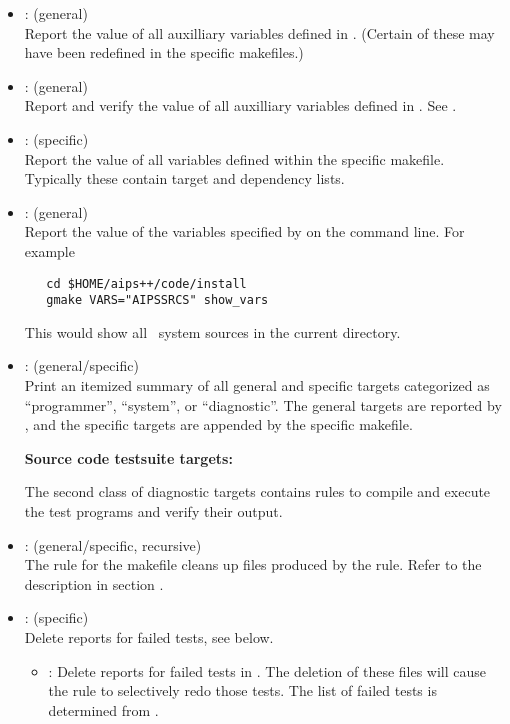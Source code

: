 \begin{itemize}
\item
     : (general)
   \\ Report the value of all auxilliary variables defined in .
   (Certain of these may have been redefined in the specific makefiles.)

\item
     : (general)
   \\ Report and verify the value of all auxilliary variables defined in
   .  See .

\item
    : (specific)
   \\ Report the value of all variables defined within the specific makefile.
   Typically these contain target and dependency lists.

\item
    : (general)
   \\ Report the value of the  variables specified by
    on the  command line.  For example
 
\begin{verbatim}
   cd $HOME/aips++/code/install
   gmake VARS="AIPSSRCS" show_vars
\end{verbatim}
 
   \noindent
   This would show all \aipspp\ system sources in the current directory.

\item
    : (general/specific)
   \\ Print an itemized summary of all general and specific targets categorized
   as ``programmer'', ``system'', or ``diagnostic''.  The general targets are
   reported by , and the specific targets are appended by the
   specific makefile.

\noindent
\textbf{Source code testsuite targets:}

\noindent
The second class of diagnostic targets contains rules to compile and execute
the test programs and verify their output.

\item
    : (general/specific, recursive)
   \\ The  rule for the  makefile cleans up files
   produced by the  rule.  Refer to the description in section
   .

\item
    : (specific)
   \\ Delete reports for failed tests, see  below.
   \begin{itemize}
   \item
      : Delete reports for failed tests in .  The
      deletion of these files will cause the  rule to
      selectively redo those tests.  The list of failed tests is determined
      from .
   \end{itemize}


\end{itemize}
